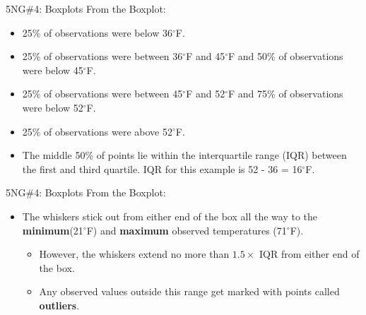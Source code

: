 \documentclass[
  ignorenonframetext,
]{beamer}
\providecommand{\tightlist}{%
  \setlength{\itemsep}{0pt}\setlength{\parskip}{0pt}}
\begin{document}
\begin{frame}{5NG\#4: Boxplots}
\protect\hypertarget{ng4-boxplots-2}{}
From the Boxplot:

\begin{itemize}
\item
  25\% of observations were below 36\(^{\circ}\)F.
\item
  25\% of observations were between 36\(^{\circ}\)F and 45\(^{\circ}\)F
  and 50\% of observations were below 45\(^{\circ}\)F.
\item
  25\% of observations were between 45\(^{\circ}\)F and 52\(^{\circ}\)F
  and 75\% of observations were below 52\(^{\circ}\)F.
\item
  25\% of observations were above 52\(^{\circ}\)F.
\item
  The middle 50\% of points lie within the interquartile range (IQR)
  between the first and third quartile. IQR for this example is 52 - 36
  = 16\(^{\circ}\)F.
\end{itemize}
\end{frame}

\begin{frame}{5NG\#4: Boxplots}
\protect\hypertarget{ng4-boxplots-3}{}
From the Boxplot:

\begin{itemize}
\item
  The whiskers stick out from either end of the box all the way to the
  \textbf{minimum}(21\(^{\circ}\)F) and \textbf{maximum} observed
  temperatures (71\(^{\circ}\)F).

  \begin{itemize}
  \tightlist
  \item
    However, the whiskers extend no more than \(1.5 \times\) IQR from
    either end of the box.
  \item
    Any observed values outside this range get marked with points called
    \textbf{outliers}.
  \end{itemize}
\end{itemize}
\end{frame}
\end{document}
